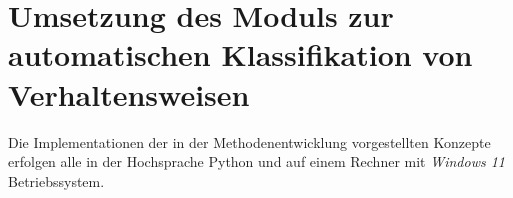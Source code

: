 \chapter{Umsetzung des Moduls zur automatischen Klassifikation von Verhaltensweisen}
Die Implementationen der in der Methodenentwicklung vorgestellten Konzepte erfolgen alle in der Hochsprache \gls{Python} und auf einem Rechner mit \textit{Windows 11} Betriebssystem. 



